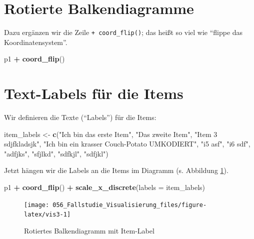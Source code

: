 \documentclass[12pt,ngerman,]{book}
\makeatletter
\newenvironment{Shaded}{\begin{snugshade}}{\end{snugshade}}
\newcommand{\KeywordTok}[1]{\textcolor[rgb]{0.13,0.29,0.53}{\textbf{#1}}}
\newcommand{\DataTypeTok}[1]{\textcolor[rgb]{0.13,0.29,0.53}{#1}}
\newcommand{\StringTok}[1]{\textcolor[rgb]{0.31,0.60,0.02}{#1}}
\newcommand{\OperatorTok}[1]{\textcolor[rgb]{0.81,0.36,0.00}{\textbf{#1}}}
\newcommand{\NormalTok}[1]{#1}
\newenvironment{kframe}{%
\medskip{}
\setlength{\fboxsep}{.8em}
 \def\at@end@of@kframe{}%
 \ifinner\ifhmode%
  \def\at@end@of@kframe{\end{minipage}}%
  \begin{minipage}{\columnwidth}%
 \fi\fi%
 \def\FrameCommand##1{\hskip\@totalleftmargin \hskip-\fboxsep
 \colorbox{shadecolor}{##1}\hskip-\fboxsep
     \hskip-\linewidth \hskip-\@totalleftmargin \hskip\columnwidth}%
 \MakeFramed {\advance\hsize-\width
   \@totalleftmargin\z@ \linewidth\hsize
   \@setminipage}}%
 {\par\unskip\endMakeFramed%
 \at@end@of@kframe}
\renewenvironment{Shaded}{\begin{kframe}}{\end{kframe}}
\theoremstyle{definition}
\theoremstyle{definition}
\theoremstyle{remark}
\makeatother
\begin{document}
\section{Rotierte Balkendiagramme}\label{rotierte-balkendiagramme}

Dazu ergänzen wir die Zeile \texttt{+\ coord\_flip()}; das heißt so viel
wie ``flippe das Koordinatensystem''.

\begin{Shaded}
\begin{Highlighting}[]
\NormalTok{p1 }\OperatorTok{+}
\StringTok{  }\KeywordTok{coord_flip}\NormalTok{()}
\end{Highlighting}
\end{Shaded}

\section{Text-Labels für die Items}\label{text-labels-fur-die-items}

Wir definieren die Texte (``Labels'') für die Items:

\begin{Shaded}
\begin{Highlighting}[]
\NormalTok{item_labels <-}\StringTok{ }\KeywordTok{c}\NormalTok{(}\StringTok{"Ich bin das erste Item"}\NormalTok{,}
                 \StringTok{"Das zweite Item"}\NormalTok{,}
                 \StringTok{"Item 3 sdjfkladsjk"}\NormalTok{,}
                 \StringTok{"Ich bin ein krasser Couch-Potato UMKODIERT"}\NormalTok{,}
\StringTok{"i5 asf"}\NormalTok{, }\StringTok{"i6 sdf"}\NormalTok{, }\StringTok{"adfjks"}\NormalTok{, }\StringTok{"sfjlkd"}\NormalTok{, }\StringTok{"sdfkjl"}\NormalTok{, }\StringTok{"sdfjkl"}\NormalTok{)}
\end{Highlighting}
\end{Shaded}

Jetzt hängen wir die Labels an die Items im Diagramm (s. Abbildung
\ref{fig:vis3}).

\begin{Shaded}
\begin{Highlighting}[]
\NormalTok{p1 }\OperatorTok{+}
\StringTok{  }\KeywordTok{coord_flip}\NormalTok{() }\OperatorTok{+}
\StringTok{  }\KeywordTok{scale_x_discrete}\NormalTok{(}\DataTypeTok{labels =}\NormalTok{ item_labels)}
\end{Highlighting}
\end{Shaded}

\begin{figure}

{\centering \texttt{[image: 056\_Fallstudie\_Visualisierung\_files/figure-latex/vis3-1]} 

}

\caption{Rotiertes Balkendiagramm mit Item-Label}\label{fig:vis3}
\end{figure}
\end{document}
